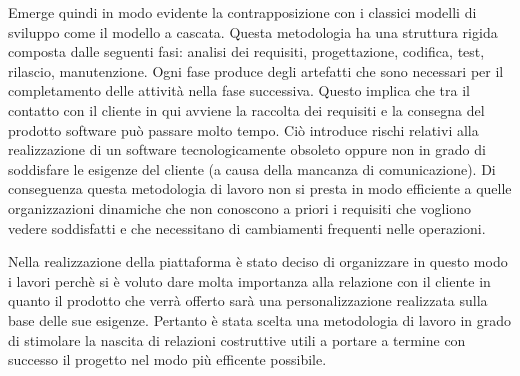 Emerge quindi in modo evidente la contrapposizione con i classici modelli di sviluppo come il modello a cascata.
Questa metodologia ha una struttura rigida composta dalle seguenti fasi: analisi dei requisiti, progettazione, codifica, test, rilascio, manutenzione.
Ogni fase produce degli artefatti che sono necessari per il completamento delle attività nella fase successiva. Questo implica che tra il contatto con il cliente
in qui avviene la raccolta dei requisiti e la consegna del prodotto software può passare molto tempo.
Ciò introduce rischi relativi alla realizzazione di un software tecnologicamente obsoleto oppure non in grado di soddisfare le
esigenze del cliente (a causa della mancanza di comunicazione).
Di conseguenza questa metodologia di lavoro non si presta in modo efficiente a quelle organizzazioni dinamiche che non conoscono
a priori i requisiti che vogliono vedere soddisfatti e che necessitano di cambiamenti frequenti nelle operazioni.

Nella realizzazione della piattaforma è stato deciso di organizzare in questo modo i lavori perchè si è voluto dare molta importanza
alla relazione con il cliente in quanto il prodotto che verrà offerto sarà una personalizzazione realizzata sulla base delle sue esigenze.
Pertanto è stata scelta una metodologia di lavoro in grado di stimolare la nascita di relazioni costruttive utili a portare a termine con successo il progetto
nel modo più efficente possibile.



